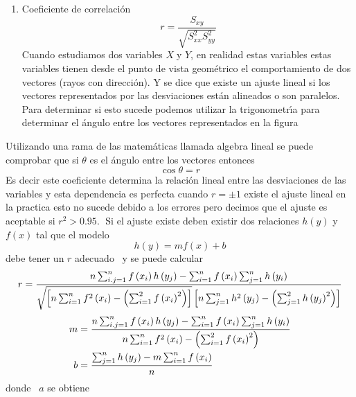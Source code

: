 \documentclass{article}
\begin{document}
\begin{enumerate}
\begin{enumerate}
\begin{enumerate}
\begin{enumerate}
\item Coeficiente de correlaci\'{o}n 
\begin{equation*}
r=\frac{S_{xy}}{\sqrt{S_{xx}^{2}S_{yy}^{2}}}
\end{equation*}
Cuando estudiamos dos variables $X\;$y $Y$, en realidad estas variables
estas variables tienen desde el punto de vista geom\'{e}trico el
comportamiento de dos vectores (rayos con direcci\'{o}n). Y se dice que
existe un ajuste lineal si los vectores representados por las desviaciones
est\'{a}n alineados o son paralelos.\newline
Para determinar si esto sucede podemos utilizar la trigonometr\'{\i}a para
determinar el \'{a}ngulo entre los vectores representados en la figura 
\end{enumerate}

Utilizando una rama de las matem\'{a}ticas llamada algebra lineal se puede
comprobar que si $\theta$ es el \'{a}ngulo entre los vectores entonces 
\begin{equation*}
\cos\theta=r
\end{equation*}
Es decir este coeficiente determina la relaci\'{o}n lineal entre las
desviaciones de las variables y esta dependencia es perfecta cuando $r=\pm1$
existe el ajuste lineal en la practica esto no sucede debido a los errores
pero decimos que el ajuste es aceptable si $r^{2}>0.95.\;$\newline
Si el ajuste existe deben existir dos relaciones $h\left( y\right) $ y $%
f\left( x\right) $ tal que el modelo 
\begin{equation*}
h\left( y\right) =mf\left( x\right) +b
\end{equation*}
debe tener un $r$ adecuado \ y se puede calcular 
\begin{equation*}
r=\frac{n\sum_{i.j=1}^{n}f\left( x_{i}\right) h\left( y_{j}\right)
-\sum_{i=1}^{n}f\left( x_{i}\right) \sum_{j=1}^{n}h\left( y_{i}\right) }{%
\sqrt{\left[ n\sum_{i=1}^{n}f^{2}\left( x_{i}\right) -\left( \sum
_{i=1}^{2}f\left( x_{i}\right) ^{2}\right) \right] }\left[ n\sum
_{j=1}^{n}h^{2}\left( y_{j}\right) -\left( \sum_{j=1}^{2}h\left(
y_{j}\right) ^{2}\right) \right] }
\end{equation*}
\begin{align*}
m & =\frac{n\sum_{i.j=1}^{n}f\left( x_{i}\right) h\left( y_{j}\right)
-\sum_{i=1}^{n}f\left( x_{i}\right) \sum_{j=1}^{n}h\left( y_{i}\right) }{%
n\sum_{i=1}^{n}f^{2}\left( x_{i}\right) -\left( \sum_{i=1}^{2}f\left(
x_{i}\right) ^{2}\right) } \\
b & =\frac{\sum_{j=1}^{n}h\left( y_{j}\right) -m\sum_{i=1}^{n}f\left(
x_{i}\right) }{n}
\end{align*}
donde \ $a$ se obtiene


\end{enumerate}
\end{enumerate}
\end{enumerate}
\end{document}
